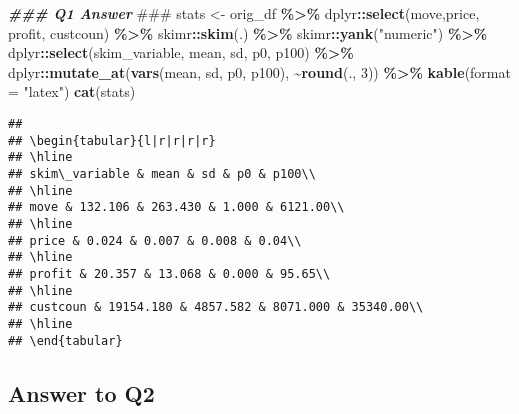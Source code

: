 \documentclass[
]{article}
\newenvironment{Shaded}{\begin{snugshade}}{\end{snugshade}}
\newcommand{\AlertTok}[1]{\textcolor[rgb]{0.94,0.16,0.16}{#1}}
\newcommand{\AttributeTok}[1]{\textcolor[rgb]{0.13,0.29,0.53}{#1}}
\newcommand{\DecValTok}[1]{\textcolor[rgb]{0.00,0.00,0.81}{#1}}
\newcommand{\DocumentationTok}[1]{\textcolor[rgb]{0.56,0.35,0.01}{\textbf{\textit{#1}}}}
\newcommand{\FunctionTok}[1]{\textcolor[rgb]{0.13,0.29,0.53}{\textbf{#1}}}
\newcommand{\NormalTok}[1]{#1}
\newcommand{\OtherTok}[1]{\textcolor[rgb]{0.56,0.35,0.01}{#1}}
\newcommand{\SpecialCharTok}[1]{\textcolor[rgb]{0.81,0.36,0.00}{\textbf{#1}}}
\newcommand{\StringTok}[1]{\textcolor[rgb]{0.31,0.60,0.02}{#1}}
\begin{document}
\begin{Shaded}
\begin{Highlighting}[]
\DocumentationTok{\#\#\# Q1 Answer }\AlertTok{\#\#\#}
\NormalTok{stats }\OtherTok{\textless{}{-}}\NormalTok{ orig\_df }\SpecialCharTok{\%\textgreater{}\%}
\NormalTok{  dplyr}\SpecialCharTok{::}\FunctionTok{select}\NormalTok{(move,price, profit, custcoun) }\SpecialCharTok{\%\textgreater{}\%}
\NormalTok{  skimr}\SpecialCharTok{::}\FunctionTok{skim}\NormalTok{(.) }\SpecialCharTok{\%\textgreater{}\%}
\NormalTok{  skimr}\SpecialCharTok{::}\FunctionTok{yank}\NormalTok{(}\StringTok{"numeric"}\NormalTok{) }\SpecialCharTok{\%\textgreater{}\%}
\NormalTok{  dplyr}\SpecialCharTok{::}\FunctionTok{select}\NormalTok{(skim\_variable, mean, sd, p0, p100) }\SpecialCharTok{\%\textgreater{}\%}
\NormalTok{  dplyr}\SpecialCharTok{::}\FunctionTok{mutate\_at}\NormalTok{(}\FunctionTok{vars}\NormalTok{(mean, sd, p0, p100), }\SpecialCharTok{\textasciitilde{}}\FunctionTok{round}\NormalTok{(., }\DecValTok{3}\NormalTok{)) }\SpecialCharTok{\%\textgreater{}\%}
  \FunctionTok{kable}\NormalTok{(}\AttributeTok{format =} \StringTok{"latex"}\NormalTok{)}
\FunctionTok{cat}\NormalTok{(stats)}
\end{Highlighting}
\end{Shaded}

\begin{verbatim}
## 
## \begin{tabular}{l|r|r|r|r}
## \hline
## skim\_variable & mean & sd & p0 & p100\\
## \hline
## move & 132.106 & 263.430 & 1.000 & 6121.00\\
## \hline
## price & 0.024 & 0.007 & 0.008 & 0.04\\
## \hline
## profit & 20.357 & 13.068 & 0.000 & 95.65\\
## \hline
## custcoun & 19154.180 & 4857.582 & 8071.000 & 35340.00\\
## \hline
## \end{tabular}
\end{verbatim}

\hypertarget{answer-to-q2}{%
\subsection{Answer to Q2}\label{answer-to-q2}}
\end{document}
